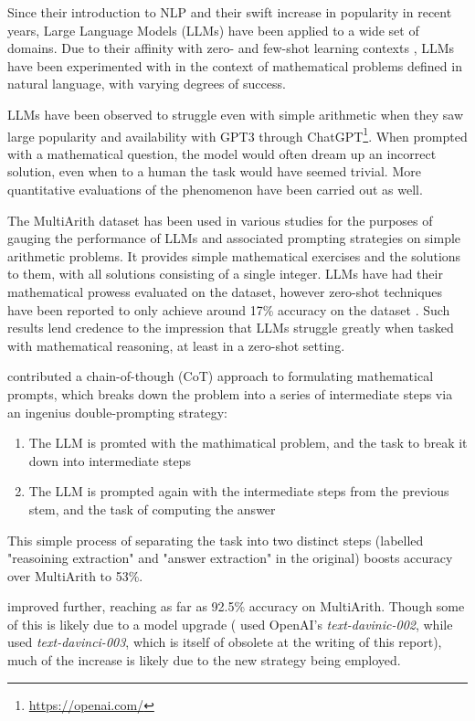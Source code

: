 \label{sec:intro}

Since their introduction to NLP and their swift increase in popularity in recent years, Large Language Models (LLMs) have been applied to a wide set of domains. Due to their affinity with zero- and few-shot learning contexts \citep{brown2020language}, LLMs have been experimented with in the context of mathematical problems defined in natural language, with varying degrees of success. 

LLMs have been observed to struggle even with simple arithmetic when they saw large popularity and availability with GPT3 through ChatGPT\footnote{\url{https://openai.com/}}. When prompted with a mathematical question, the model would often dream up an incorrect solution, even when to a human the task would have seemed trivial. More quantitative evaluations of the phenomenon have been carried out as well.

The MultiArith dataset \citep{roy-roth-2015-solving} has been used in various studies for the purposes of gauging the performance of LLMs and associated prompting strategies on simple arithmetic problems. It provides simple mathematical exercises and the solutions to them, with all solutions consisting of a single integer. LLMs have had their mathematical prowess evaluated on the dataset, however zero-shot techniques have been reported to only achieve around 17\% accuracy on the dataset \citep{kojima2023large}. Such results lend credence to the impression that LLMs struggle greatly when tasked with mathematical reasoning, at least in a zero-shot setting.

\citealp{kojima2023large} contributed a chain-of-though (CoT) approach to formulating mathematical prompts, which breaks down the problem into a series of intermediate steps via an ingenius double-prompting strategy:

\begin{enumerate}
    \item The LLM is promted with the mathimatical problem, and the task to break it down into intermediate steps
    \item The LLM is prompted again with the intermediate steps from the previous stem, and the task of computing the answer
\end{enumerate}

This simple process of separating the task into two distinct steps (labelled "reasoining extraction" and "answer extraction" in the original) boosts accuracy over MultiArith to 53\%. 

\citealp{imani-etal-2023-mathprompter} improved further, reaching as far as 92.5\% accuracy on MultiArith. Though some of this is likely due to a model upgrade (\citealp{kojima2023large} used OpenAI's \emph{text-davinic-002}, while \citealp{imani-etal-2023-mathprompter} used \emph{text-davinci-003}, which is itself of obsolete at the writing of this report), much of the increase is likely due to the new strategy being employed.